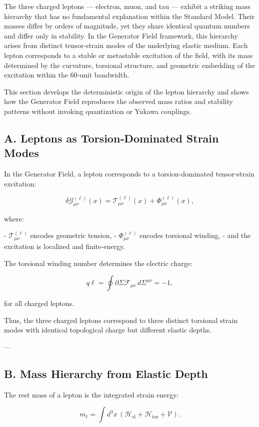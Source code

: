 \documentclass[reprint,amsmath,amssymb,aps,prl,floatfix]{revtex4-2}
\begin{document}
The three charged leptons — electron, muon, and tau — exhibit a striking mass hierarchy that has no fundamental explanation within the Standard Model. Their masses differ by orders of magnitude, yet they share identical quantum numbers and differ only in stability. In the Generator Field framework, this hierarchy arises from distinct tensor‑strain modes of the underlying elastic medium. Each lepton corresponds to a stable or metastable excitation of the field, with its mass determined by the curvature, torsional structure, and geometric embedding of the excitation within the 60‑unit bandwidth.
\medskip

This section develops the deterministic origin of the lepton hierarchy and shows how the Generator Field reproduces the observed mass ratios and stability patterns without invoking quantization or Yukawa couplings.

\subsection{A. Leptons as Torsion‑Dominated Strain Modes}

In the Generator Field, a lepton corresponds to a torsion‑dominated tensor‑strain excitation:

\[
\delta\mathcal{G}_{\mu\nu}^{(\ell)}(x)
=
\mathcal{T}_{\mu\nu}^{(\ell)}(x)
+
\Phi_{\mu\nu}^{(\ell)}(x),
\]

where:

- \(\mathcal{T}_{\mu\nu}^{(\ell)}\) encodes geometric tension,  
- \(\Phi_{\mu\nu}^{(\ell)}\) encodes torsional winding,  
- and the excitation is localized and finite‑energy.

The torsional winding number determines the electric charge:

\[
q\ell = \oint{\partial\Sigma} \mathcal{F}_{\mu\nu}\,d\Sigma^{\mu\nu} = -1,
\]

for all charged leptons.

Thus, the three charged leptons correspond to three distinct torsional strain modes with identical topological charge but different elastic depths.

---

\subsection{B. Mass Hierarchy from Elastic Depth}

The rest mass of a lepton is the integrated strain energy:

\[
m_\ell = \int d^3x\,
\left(
\mathcal{H}_{\mathrm{el}}
+
\mathcal{H}_{\mathrm{tor}}
+
\mathcal{V}
\right).
\]
\end{document}
